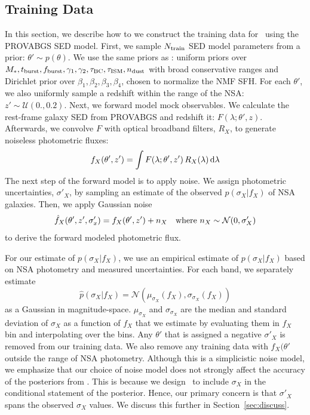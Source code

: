 \subsection{Training Data} \label{sec:training}
In this section, we describe how to we construct the training data for
\sedflow~using the PROVABGS SED model.
First, we sample $N_{\rm train}$ SED model parameters from a prior: $\theta'\sim p(\theta)$. 
We use the same priors as \cite{hahn2022}: uniform priors over $M_*,
t_{\rm burst}, f_{\rm burst}, \gamma_1, \gamma_2, \tau_{\rm BC}, \tau_{\rm ISM},
n_{\rm dust}$ with broad conservative ranges and Dirichlet prior over $\beta_1,
\beta_2, \beta_3, \beta_4$, chosen to normalize the NMF SFH.
For each $\theta'$, we also uniformly sample a redshift within the range of the
NSA: $z' \sim \mathcal{U}(0., 0.2)$. 
Next, we forward model mock observables. 
We calculate the rest-frame galaxy SED from PROVABGS and redshift it: 
$F(\lambda;\theta', z)$. 
Afterwards, we convolve $F$ with optical broadband filters, $R_X$, to generate
noiseless photometric fluxes:
\begin{equation}
    f_X(\theta', z') = \int F(\lambda;\theta', z') \, R_X(\lambda) \, {\rm d}\lambda
\end{equation}
The next step of the forward model is to apply noise. 
We assign photometric uncertainties, $\sigma'_X$, by sampling an estimate of
the observed $p(\sigma_X | f_X)$ of NSA galaxies. 
Then, we apply Gaussian noise
\begin{equation} \label{eq:noise} 
    \hat{f}_X(\theta', z', \sigma'_x) = f_X(\theta', z') + n_X  \quad {\rm where}~n_X \sim \mathcal{N}(0, \sigma'_X)
\end{equation}
to derive the forward modeled photometric flux.

For our estimate of $p(\sigma_X | f_X)$, we use an empirical estimate of
$p(\sigma_X | f_X)$ based on NSA photometry and measured uncertainties. 
For each band, we separately estimate  
\begin{equation}
    \hat{p}(\sigma_X | f_X) = \mathcal{N}( \mu_{\sigma_X}(f_X), \sigma_{\sigma_X}(f_X))
\end{equation}
as a Gaussian in magnitude-space. 
$\mu_{\sigma_X}$ and $\sigma_{\sigma_X}$ are the median and standard deviation
of $\sigma_X$ as a function of $f_X$ that we estimate by evaluating them in
$f_X$ bin and interpolating over the bins. 
Any $\theta'$ that is assigned a negative $\sigma'_X$ is removed from our
training data. 
We also remove any training data with $f_X(\theta'$ outside the range of NSA
photometry. 
Although this is a simplicistic noise model, we emphasize that our choice of
noise model does not strongly affect the accuracy of the posteriors from
\sedflow.
This is because we design \sedflow~to include $\sigma_X$ in the conditional
statement of the posterior. 
Hence, our primary concern is that $\sigma'_X$ spans the observed $\sigma_X$
values. 
We discuss this further in Section~\ref{sec:discuss}.

